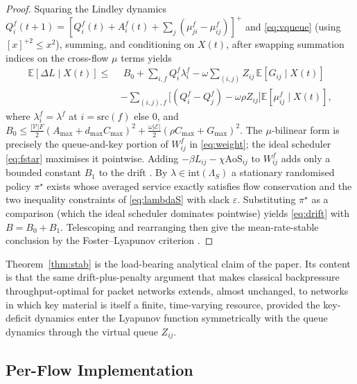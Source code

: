 \documentclass[conference]{IEEEtran}
\begin{document}
\begin{proof}
Squaring the Lindley dynamics
$Q^f_i(t{+}1)=[Q^f_i(t)+A^f_i(t)+\sum_j(\mu^f_{ji}{-}\mu^f_{ij})]^{+}$
and \eqref{eq:vqueue} (using $[x]^{+2}\!\le\!x^2$), summing, and
conditioning on $X(t)$, after swapping summation indices on the
cross-flow $\mu$ terms yields
\begin{equation*}
\begin{split}
\mathbb{E}[\Delta L\mid X(t)]\le\,&\; B_0
 + \!\sum_{i,f}\!Q^f_i\lambda^f_i
 - \omega\!\sum_{(i,j)}\!Z_{ij}\,\mathbb{E}[G_{ij}\mid X(t)]\\
 &-\!\sum_{(i,j),f}\!\bigl[(Q^f_i{-}Q^f_j) - \omega\rho Z_{ij}\bigr]
       \mathbb{E}[\mu^f_{ij}\!\mid\!X(t)],
\end{split}
\end{equation*}
where $\lambda^f_i\!=\!\lambda^f$ at $i\!=\!\mathrm{src}(f)$ else $0$, and
$B_0\!\le\!\tfrac{|\mathcal{V}|F}{2}(A_{\max}{+}d_{\max}C_{\max})^2
+\tfrac{\omega|\mathcal{E}|}{2}(\rho C_{\max}{+}G_{\max})^2$.  The
$\mu$-bilinear form is precisely the queue-and-key portion of
$W^f_{ij}$ in \eqref{eq:weight}; the ideal scheduler \eqref{eq:fstar}
maximises it pointwise.  Adding $-\beta L_{ij}-\chi\mathrm{AoS}_{ij}$
to $W^f_{ij}$ adds only a bounded constant $B_1$ to the drift
\cite[Sec.~4.5]{neely_book_2010}.  By $\lambda\!\in\!\mathrm{int}(\Lambda_S)$ a
stationary randomised policy $\pi^\star$ exists whose averaged
service exactly satisfies flow conservation and the two inequality
constraints of \eqref{eq:lambdaS} with slack $\varepsilon$.
Substituting $\pi^\star$ as a comparison (which the ideal scheduler
dominates pointwise) yields \eqref{eq:drift} with $B\!=\!B_0{+}B_1$.
Telescoping and rearranging then give the mean-rate-stable conclusion
by the Foster--Lyapunov criterion
\cite[Theorems 4.5,~4.8]{neely_book_2010}.
\end{proof}

Theorem~\ref{thm:stab} is the load-bearing analytical claim of the
paper.  Its content is that the same drift-plus-penalty argument
that makes classical backpressure throughput-optimal for packet
networks extends, almost unchanged, to networks in which key
material is itself a finite, time-varying resource, provided the
key-deficit dynamics enter the Lyapunov function symmetrically with
the queue dynamics through the virtual queue $Z_{ij}$.

\subsection{Per-Flow Implementation}
\label{sec:impl-alg}
\end{document}
